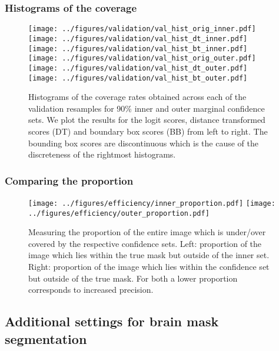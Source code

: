 \subsubsection{Histograms of the coverage}
\begin{figure}[h!]
	\begin{center}
		\texttt{[image: ../figures/validation/val\_hist\_orig\_inner.pdf]}
		\texttt{[image: ../figures/validation/val\_hist\_dt\_inner.pdf]}
		\texttt{[image: ../figures/validation/val\_hist\_bt\_inner.pdf]}\\
		\texttt{[image: ../figures/validation/val\_hist\_orig\_outer.pdf]}
		\texttt{[image: ../figures/validation/val\_hist\_dt\_outer.pdf]}
		\texttt{[image: ../figures/validation/val\_hist\_bt\_outer.pdf]}
	\end{center}
	\caption{Histograms of the coverage rates obtained across each of the validation resamples for 90\% inner and outer marginal confidence sets. We plot the results for the logit scores, distance transformed scores (DT) and boundary box scores (BB) from left to right. The bounding box scores are discontinuous which is the cause of the discreteness of the rightmost histograms.}\label{fig:valhist}
\end{figure}

\subsubsection{Comparing the proportion}

\begin{figure}[h!]
	\begin{center}
		\texttt{[image: ../figures/efficiency/inner\_proportion.pdf]}
		\quad\quad
		\texttt{[image: ../figures/efficiency/outer\_proportion.pdf]}
	\end{center}
	\caption{Measuring the proportion of the entire image which is under/over covered by the respective confidence sets. Left: proportion of the image which lies within the true mask but outside of the inner set. Right: proportion of the image which lies within the confidence set but outside of the true mask. For both a lower proportion corresponds to increased precision. }\label{fig:efficiency2}
\end{figure}

\newpage
\subsection{Additional settings for brain mask segmentation}

